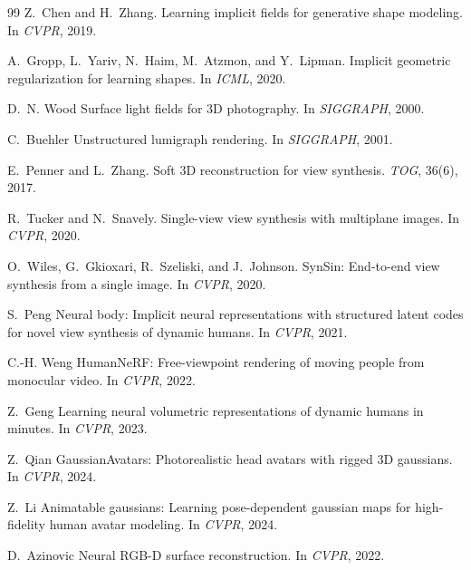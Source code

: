 \begin{thebibliography}{99}
Z.~Chen and H.~Zhang.
Learning implicit fields for generative shape modeling.
In \emph{CVPR}, 2019.


A.~Gropp, L.~Yariv, N.~Haim, M.~Atzmon, and Y.~Lipman.
Implicit geometric regularization for learning shapes.
In \emph{ICML}, 2020.


D.~N. Wood \etal
Surface light fields for 3{D} photography.
In \emph{SIGGRAPH}, 2000.


C.~Buehler \etal
Unstructured lumigraph rendering.
In \emph{SIGGRAPH}, 2001.


E.~Penner and L.~Zhang.
Soft 3{D} reconstruction for view synthesis.
\emph{TOG}, 36(6), 2017.


R.~Tucker and N.~Snavely.
Single-view view synthesis with multiplane images.
In \emph{CVPR}, 2020.


O.~Wiles, G.~Gkioxari, R.~Szeliski, and J.~Johnson.
{SynSin}: End-to-end view synthesis from a single image.
In \emph{CVPR}, 2020.


S.~Peng \etal
Neural body: Implicit neural representations with structured latent codes for
novel view synthesis of dynamic humans.
In \emph{CVPR}, 2021.


C.-H. Weng \etal
{HumanNeRF}: Free-viewpoint rendering of moving people from monocular video.
In \emph{CVPR}, 2022.


Z.~Geng \etal
Learning neural volumetric representations of dynamic humans in minutes.
In \emph{CVPR}, 2023.


Z.~Qian \etal
{GaussianAvatars}: Photorealistic head avatars with rigged 3{D} gaussians.
In \emph{CVPR}, 2024.


Z.~Li \etal
Animatable gaussians: Learning pose-dependent gaussian maps for high-fidelity
human avatar modeling.
In \emph{CVPR}, 2024.


D.~Azinovic \etal
Neural {RGB-D} surface reconstruction.
In \emph{CVPR}, 2022.



\end{thebibliography}
